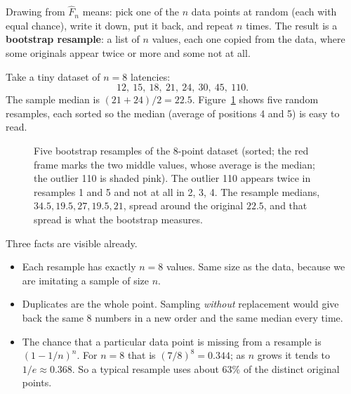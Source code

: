 Drawing from $\hat F_n$ means: pick one of the $n$ data points at random
(each with equal chance), write it down, put it back, and repeat $n$ times. The result is a
\textbf{bootstrap resample}: a list of $n$ values, each one copied from the
data, where some originals appear twice or more and some not at all.

Take a tiny dataset of $n=8$ latencies:
\[
  12,\ 15,\ 18,\ 21,\ 24,\ 30,\ 45,\ 110 .
\]
The sample median is $(21+24)/2 = 22.5$. Figure~\ref{fig:bootstrap-resamples}
shows five random resamples, each sorted so the median (average of positions 4
and 5) is easy to read.

\begin{figure}[H]
\centering
{}
\caption{Five bootstrap resamples of the 8-point dataset (sorted; the red frame
marks the two middle values, whose average is the median; the outlier 110 is
shaded pink). The outlier 110 appears twice in resamples 1 and
5 and not at all in 2, 3, 4. The resample medians, $34.5, 19.5, 27, 19.5, 21$,
spread around the original $22.5$, and that spread is what the bootstrap
measures.}
\label{fig:bootstrap-resamples}
\end{figure}

Three facts are visible already.
\begin{itemize}
  \item Each resample has exactly $n=8$ values. Same size as the data, because
  we are imitating a sample of size $n$.
  \item Duplicates are the whole point. Sampling \emph{without} replacement
  would give back the same 8 numbers in a new order and the same median every
  time.
  \item The chance that a particular data point is missing from a resample is
  $(1-1/n)^n$. For $n=8$ that is $(7/8)^8 = 0.344$; as $n$ grows it tends to
  $1/e \approx 0.368$. So a typical resample uses about $63\%$ of the distinct
  original points.
\end{itemize}

